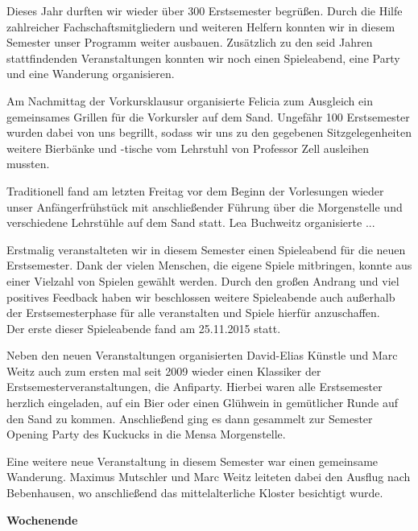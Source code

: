 Dieses Jahr durften wir wieder über 300 Erstsemester begrüßen. Durch die Hilfe zahlreicher Fachschaftsmitgliedern und weiteren Helfern konnten wir in diesem Semester unser Programm weiter ausbauen. Zusätzlich zu den seid Jahren stattfindenden Veranstaltungen konnten wir noch einen Spieleabend, eine Party und eine Wanderung organisieren.
%

Am Nachmittag der Vorkursklausur organisierte Felicia zum Ausgleich ein gemeinsames Grillen für die Vorkursler auf dem Sand. Ungefähr 100 Erstsemester wurden dabei von uns begrillt, sodass wir uns zu den gegebenen Sitzgelegenheiten weitere Bierbänke und -tische vom Lehrstuhl von Professor Zell ausleihen mussten.
%

Traditionell fand am letzten Freitag vor dem Beginn der Vorlesungen wieder unser Anfängerfrühstück mit anschließender Führung über die Morgenstelle und verschiedene Lehrstühle auf dem Sand statt. 
Lea Buchweitz organisierte ...
%
%
%

Erstmalig veranstalteten wir in diesem Semester einen Spieleabend für die neuen Erstsemester. Dank der vielen Menschen, die eigene Spiele mitbringen, konnte aus einer Vielzahl von Spielen gewählt werden.
Durch den großen Andrang und viel positives Feedback haben wir beschlossen weitere Spieleabende auch außerhalb der Erstsemesterphase für alle veranstalten und Spiele hierfür anzuschaffen.\\
Der erste dieser Spieleabende fand am 25.11.2015 statt.
%

Neben den neuen Veranstaltungen organisierten David-Elias Künstle und Marc Weitz auch zum ersten mal seit 2009 wieder einen Klassiker der Erstsemesterveranstaltungen, die Anfiparty. Hierbei waren alle Erstsemester herzlich eingeladen, auf ein Bier oder einen Glühwein in gemütlicher Runde auf den Sand zu kommen. Anschließend ging es dann gesammelt zur Semester Opening Party des Kuckucks in die Mensa Morgenstelle.
%

Eine weitere neue Veranstaltung in diesem Semester war einen gemeinsame Wanderung. Maximus Mutschler und Marc Weitz leiteten dabei den Ausflug nach Bebenhausen, wo anschließend das mittelalterliche Kloster besichtigt wurde. 

\textbf{Wochenende}

